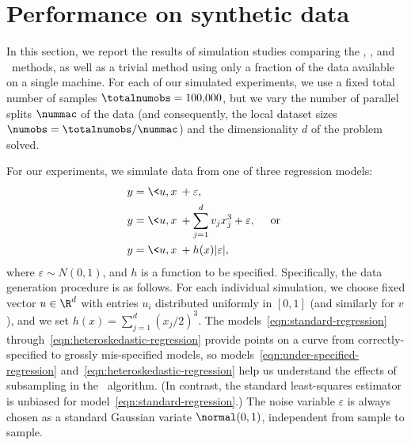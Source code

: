 \documentclass[11pt,twoside]{article}
\theoremstyle{definition}
\begin{document}




\section{Performance on synthetic data}
\label{sec:simulations}

In this section, we report the results of simulation studies comparing the
\avgm, \savgm, and \sgdavgm\ methods, as well as a trivial method using only a
fraction of the data available on a single machine. For each of our simulated
experiments, we use a fixed total number of samples $\totalnumobs =
100,\!000$, but we vary the number of parallel splits $\nummac$ of the data
(and consequently, the local dataset sizes $\numobs = \totalnumobs / \nummac$)
and the dimensionality $d$ of the problem solved.

For our experiments, we simulate data from one of three regression models:
\begin{subequations}
  \begin{align}
    y & = \<u, x\> + \varepsilon, \label{eqn:standard-regression} \\
    y & = \<u, x\> + \sum_{j = 1}^d v_j x_j^3
    + \varepsilon, ~~~~ \mbox{or} ~
    \label{eqn:under-specified-regression} \\
    y & = \<u, x\> + h(x) |\varepsilon|,
    \label{eqn:heteroskedastic-regression}
  \end{align}
\end{subequations}
where $\varepsilon \sim N(0,1)$, and $h$ is a function to be
specified.  Specifically, the data generation procedure is as follows.
For each individual simulation, we choose fixed vector $u \in \R^d$
with entries $u_i$ distributed uniformly in $[0, 1]$ (and similarly
for $v$), and we set \mbox{$h(x) = \sum_{j=1}^d (x_j/2)^3$.} The
models~\eqref{eqn:standard-regression}
through~\eqref{eqn:heteroskedastic-regression} provide points on a
curve from correctly-specified to grossly mis-specified models, so
models~\eqref{eqn:under-specified-regression}
and~\eqref{eqn:heteroskedastic-regression} help us understand the
effects of subsampling in the \savgm\ algorithm.  (In contrast, the
standard least-squares estimator is unbiased for
model~\eqref{eqn:standard-regression}.)  The noise variable
$\varepsilon$ is always chosen as a standard Gaussian variate
$\normal(0, 1)$, independent from sample to sample.
\end{document}
